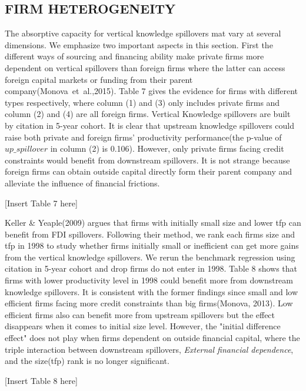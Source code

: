 \documentclass[12pt]{article}%
\begin{document}
\begin{CJK*}{GBK}{fs}
\subsection{FIRM HETEROGENEITY}
\par The absorptive capacity for vertical knowledge spillovers mat vary at several dimensions. We emphasize two important aspects in this section. First the different ways of sourcing and financing ability make private firms more dependent on vertical spillovers than foreign firms where the latter can access foreign capital markets or funding from
their parent company(\textcolor[rgb]{0.00,0.07,1.00}{Monova~et~al.,2015}). Table 7 gives the evidence for firms with different types respectively, where column (1) and (3) only includes private firms and column (2) and (4) are all foreign firms. Vertical Knowledge spillovers are built by citation in 5-year cohort. It is clear that upstream knowledge spillovers could raise both private and foreign firms' productivity performance(the p-value of $up\_spillover$ in column (2) is 0.106). However, only private firms facing credit constraints would benefit from downstream spillovers. It is not strange because foreign firms can obtain outside capital directly form their parent company and alleviate the influence of financial frictions.
\begin{center}
  [Insert Table 7 here]
\end{center}
\par \textcolor[rgb]{0.00,0.07,1.00}{Keller \& Yeaple(2009)} argues that firms with initially small size and lower tfp can benefit from FDI spillovers. Following their method, we rank each firms size and tfp in 1998 to study whether firms initially small or inefficient can get more gains from the vertical knowledge spillovers. We rerun the benchmark regression using citation in 5-year cohort and drop firms do not enter in 1998. Table 8 shows that firms with lower productivity level in 1998 could benefit more from downstream knowledge spillovers. It is consistent with the former findings since small and low efficient firms facing more credit constraints than big firms(\textcolor[rgb]{0.00,0.07,1.00}{Monova, 2013}). Low efficient firms also can benefit more from upstream spillovers but the effect disappears when it comes to initial size level.  However, the "initial difference effect" does not play when firms dependent on outside financial capital, where the triple interaction between downstream spillovers, \emph{External financial dependence}, and the size(tfp) rank is no longer significant.
\begin{center}
  [Insert Table 8 here]
\end{center}




\end{CJK*}
\end{document}
